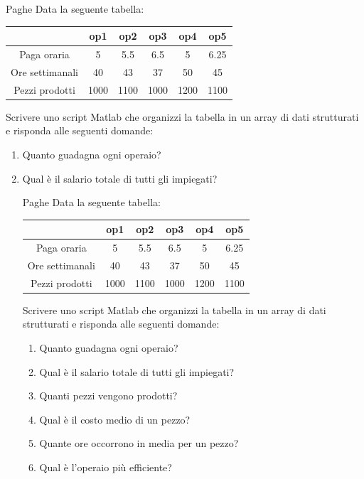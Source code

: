 \documentclass[aspectratio=169, handout]{beamer}
\begin{document}
\begin{frame}{Paghe}
    Data la seguente tabella:

    \begin{tabular}{|c|c|c|c|c|c|}
        \hline
        & op1 & op2 & op3 & op4 & op5 \\
        \hline
        Paga oraria & 5 & 5.5 & 6.5 & 5 & 6.25 \\
        \hline
        Ore settimanali & 40 & 43 & 37 & 50 & 45 \\
        \hline
        Pezzi prodotti & 1000 & 1100 & 1000 & 1200 & 1100 \\
        \hline
    \end{tabular}

    Scrivere uno script Matlab che organizzi la tabella in un array di dati strutturati e risponda alle seguenti domande:
    \begin{enumerate}
        \item Quanto guadagna ogni operaio?
        \item Qual è il salario totale di tutti gli impiegati?
\begin{frame}{Paghe}
    Data la seguente tabella:

    \begin{tabular}{|c|c|c|c|c|c|}
        \hline
        & op1 & op2 & op3 & op4 & op5 \\
        \hline
        Paga oraria & 5 & 5.5 & 6.5 & 5 & 6.25 \\
        \hline
        Ore settimanali & 40 & 43 & 37 & 50 & 45 \\
        \hline
        Pezzi prodotti & 1000 & 1100 & 1000 & 1200 & 1100 \\
        \hline
    \end{tabular}

    Scrivere uno script Matlab che organizzi la tabella in un array di dati strutturati e risponda alle seguenti domande:
    \begin{enumerate}
        \item Quanto guadagna ogni operaio?
        \item Qual è il salario totale di tutti gli impiegati?
        \item Quanti pezzi vengono prodotti?
        \item Qual è il costo medio di un pezzo?
        \item Quante ore occorrono in media per un pezzo?
        \item Qual è l’operaio più efficiente?
    \end{enumerate}
\end{frame}


\end{enumerate}
\end{frame}
\end{document}
